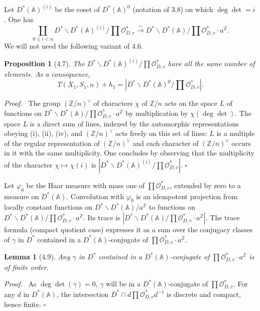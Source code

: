 \documentclass[10pt]{article}
\newcommand{\Z}{\mathbb Z}
\newcommand{\Adele}{\mathbb A}
\newcommand{\degm}{\operatorname{deg}}
\newcommand{\detm}{\operatorname{det}}
\theoremstyle{deligne}
\newtheorem*{proposition*}{Proposition}
\newtheorem*{lemma*}{Lemma}
\newenvironment{proofdel}[1][Proof.]{\textit{#1}\ }{\hfill$\square$}
\newcommand{\heading}[1]{\vspace{0.7em}\noindent{\bfseries #1}\quad}
\begin{document}
Let $D^*(\Adele)^{(i)}$ be the coset of $D^*(\Adele)^0$ (notation of 3.8) on which $\degm\detm=i$. One has
\[
\coprod_{0\le i<n}D^*\backslash D^*(\Adele)^{(i)}/\prod\mathcal O_{D,v}^*
\xrightarrow{\sim}
D^*\backslash D^*(\Adele)/\prod\mathcal O_{D,v}^*\cdot a^\Z.
\]
We will not need the following variant of 4.6.

\begin{proposition*}[4.7]
The $D^*\backslash D^*(\Adele)^{(i)}/\prod\mathcal O_{D,v}^*$ have all the same number of elements. As a consequence,
\[
T(X_1,S_1,n)+h_1=\left|D^*\backslash D^*(\Adele)^0/\prod\mathcal O_{D,v}^*\right|.
\]
\end{proposition*}

\begin{proofdel}
The group $(\Z/n)^\vee$ of characters $\chi$ of $\Z/n$ acts on the space $L$ of functions on $D^*\backslash D^*(\Adele)/\prod\mathcal O_{D,v}^*\cdot a^\Z$ by multiplication by $\chi(\degm\detm)$. The space $L$ is a direct sum of lines, indexed by the automorphic representations obeying (i), (ii), (iv), and $(\Z/n)^\vee$ acts freely on this set of lines: $L$ is a multiple of the regular representation of $(\Z/n)^\vee$ and each character of $(\Z/n)^\vee$ occurs in it with the same multiplicity. One concludes by observing that the multiplicity of the character $\chi\mapsto\chi(i)$ is $|D^*\backslash D^*(\Adele)^{(i)}/\prod\mathcal O_{D,v}^*|$.
\end{proofdel}

\heading{4.8.} Let $\varphi_0$ be the Haar measure with mass one of $\prod\mathcal O_{D,v}^*$, extended by zero to a measure on $D^*(\Adele)$. Convolution with $\varphi_0$ is an idempotent projection from locally constant functions on $D^*\backslash D^*(\Adele)/a^\Z$ to functions on $D^*\backslash D^*(\Adele)/\prod\mathcal O_{D,v}^*\cdot a^\Z$. Its trace is $|D^*\backslash D^*(\Adele)/\prod\mathcal O_{D,v}^*\cdot a^\Z|$. The trace formula (compact quotient case) expresses it as a sum over the conjugacy classes of $\gamma$ in $D^*$ contained in a $D^*(\Adele)$-conjugate of $\prod\mathcal O_{D,v}^*\cdot a^\Z$.

\begin{lemma*}[4.9]
Any $\gamma$ in $D^*$ contained in a $D^*(\Adele)$-conjugate of $\prod\mathcal O_{D,v}^*\cdot a^\Z$ is of finite order.
\end{lemma*}

\begin{proofdel}
As $\degm\detm(\gamma)=0$, $\gamma$ will be in a $D^*(\Adele)$-conjugate of $\prod\mathcal O_{D,v}^*$. For any $d$ in $D^*(\Adele)$, the intersection $D^*\cap d\prod\mathcal O_{D,v}^*d^{-1}$ is discrete and compact, hence finite.
\end{proofdel}
\end{document}
